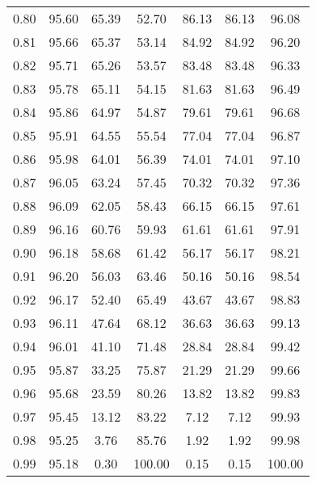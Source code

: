 \begin{tabular}{|c|c|c|c|c|c|c|}
      0.80 &     95.60 &     65.39 &      52.70 &   86.13 &      86.13 &         96.08 \\
      0.81 &     95.66 &     65.37 &      53.14 &   84.92 &      84.92 &         96.20 \\
      0.82 &     95.71 &     65.26 &      53.57 &   83.48 &      83.48 &         96.33 \\
      0.83 &     95.78 &     65.11 &      54.15 &   81.63 &      81.63 &         96.49 \\
      0.84 &     95.86 &     64.97 &      54.87 &   79.61 &      79.61 &         96.68 \\
      0.85 &     95.91 &     64.55 &      55.54 &   77.04 &      77.04 &         96.87 \\
      0.86 &     95.98 &     64.01 &      56.39 &   74.01 &      74.01 &         97.10 \\
      0.87 &     96.05 &     63.24 &      57.45 &   70.32 &      70.32 &         97.36 \\
      0.88 &     96.09 &     62.05 &      58.43 &   66.15 &      66.15 &         97.61 \\
      0.89 &     96.16 &     60.76 &      59.93 &   61.61 &      61.61 &         97.91 \\
      0.90 &     96.18 &     58.68 &      61.42 &   56.17 &      56.17 &         98.21 \\
      0.91 &     96.20 &     56.03 &      63.46 &   50.16 &      50.16 &         98.54 \\
      0.92 &     96.17 &     52.40 &      65.49 &   43.67 &      43.67 &         98.83 \\
      0.93 &     96.11 &     47.64 &      68.12 &   36.63 &      36.63 &         99.13 \\
      0.94 &     96.01 &     41.10 &      71.48 &   28.84 &      28.84 &         99.42 \\
      0.95 &     95.87 &     33.25 &      75.87 &   21.29 &      21.29 &         99.66 \\
      0.96 &     95.68 &     23.59 &      80.26 &   13.82 &      13.82 &         99.83 \\
      0.97 &     95.45 &     13.12 &      83.22 &    7.12 &       7.12 &         99.93 \\
      0.98 &     95.25 &      3.76 &      85.76 &    1.92 &       1.92 &         99.98 \\
      0.99 &     95.18 &      0.30 &     100.00 &    0.15 &       0.15 &        100.00 \\
\bottomrule
\end{tabular}
